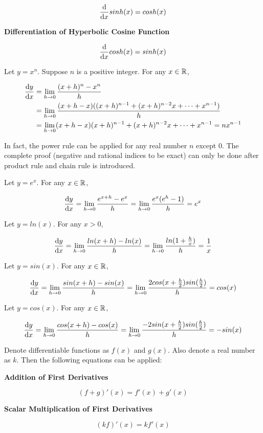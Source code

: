 \documentclass[a4paper,12pt]{article}
\begin{document}
\begin{thm}
\begin{alist}
    $$\frac{\mathrm{d} }{\mathrm{d}  x}sinh(x)=cosh(x)$$

    \item \textbf{Differentiation of Hyperbolic Cosine Function}

    $$\frac{\mathrm{d} }{\mathrm{d}  x}cosh(x)=sinh(x)$$
  \end{alist}

   Let $y=x^{n}$. Suppose $n$ is a positive integer. For any $x\in \mathbb{R}$,

  $$\begin{aligned}[t]
    \frac{\mathrm{d}  y}{\mathrm{d}  x}&=\lim_{h\to 0}\frac{(x+h)^{n}-x^{n}}{h}\\
    &=\lim_{h\to 0}\frac{(x+h-x)((x+h)^{n-1}+(x+h)^{n-2}x+\cdots+x^{n-1})}{h}\\
    &=\lim_{h\to 0}(x+h-x)(x+h)^{n-1}+(x+h)^{n-2}x+\cdots+x^{n-1}=nx^{n-1}
  \end{aligned}$$\s

  In fact, the power rule can be applied for any real number $n$ except $0$. The complete proof (negative and rational indices to be exact) can only be done after product rule and chain rule is introduced.\n

   Let $y=e^{x}$. For any $x \in \mathbb{R}$,

  $$\frac{\mathrm{d}  y}{\mathrm{d}  x}=\lim_{h\to 0}\frac{e^{x+h}-e^{x}}{h}=\lim_{h\to 0}\frac{e^{x}(e^{h}-1)}{h}=e^{x}$$

   Let $y=ln(x)$. For any $x>0$,

  $$\frac{\mathrm{d}  y}{\mathrm{d}  x}=\lim_{h\to 0}\frac{ln(x+h)-ln(x)}{h}=\lim_{h\to 0}\frac{ln(1+\frac{h}{x})}{h}=\frac{1}{x}$$

   Let $y=sin(x)$. For any $x\in \mathbb{R}$,

  $$\frac{\mathrm{d}  y}{\mathrm{d}  x}=\lim_{h\to 0}\frac{sin(x+h)-sin(x)}{h}=\lim_{h\to 0}\frac{2cos(x+\frac{h}{2})sin(\frac{h}{2})}{h}=cos(x)$$

   Let $y=cos(x)$. For any $x\in \mathbb{R}$,

  $$\frac{\mathrm{d}  y}{\mathrm{d}  x}=\lim_{h\to 0}\frac{cos(x+h)-cos(x)}{h}=\lim_{h\to 0}\frac{-2sin(x+\frac{h}{2})sin(\frac{h}{2})}{h}=-sin(x)$$
\end{thm}\n

\begin{thm}
  Denote differentiable functions as $f(x)$ and $g(x)$. Also denote a real number as $k$. Then the following equations can be applied:

  \begin{alist}
    \item \textbf{Addition of First Derivatives}

    $$(f+g)'(x)=f'(x)+g'(x)$$

    \item \textbf{Scalar Multiplication of First Derivatives}

    $$(kf)'(x)=kf'(x)$$
  \end{alist}
\end{thm}
\end{document}
